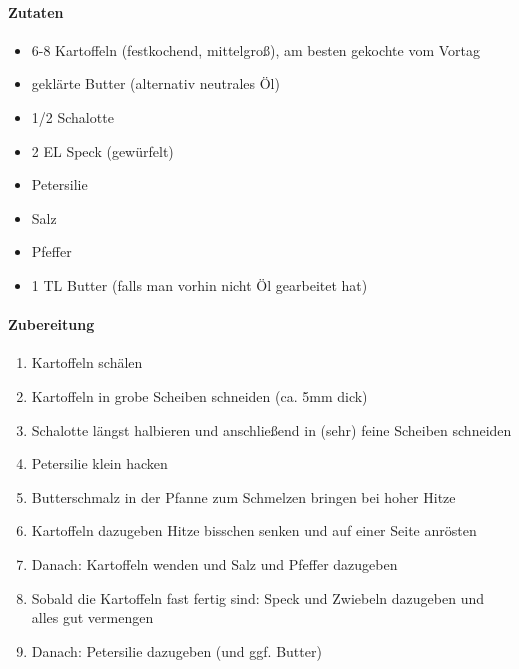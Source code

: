 \newpage
{}
\paragraph{Zutaten}
\begin{itemize}[noitemsep]
	\item 6-8 Kartoffeln (festkochend, mittelgroß), am besten gekochte vom Vortag
	\item geklärte Butter (alternativ neutrales Öl)
	\item 1/2 Schalotte
	\item 2 EL Speck (gewürfelt)
	\item Petersilie 
	\item Salz
	\item Pfeffer
	\item 1 TL Butter (falls man vorhin nicht Öl gearbeitet hat)
\end{itemize}
\paragraph{Zubereitung}
\begin{enumerate}[noitemsep]
	\item Kartoffeln schälen
	\item Kartoffeln in grobe Scheiben schneiden (ca. 5mm dick)
	\item Schalotte längst halbieren und anschließend in (sehr) feine Scheiben schneiden 
	\item Petersilie klein hacken 
	\item Butterschmalz in der Pfanne zum Schmelzen bringen bei hoher Hitze
	\item Kartoffeln dazugeben Hitze bisschen senken und auf einer Seite anrösten 
	\item Danach: Kartoffeln wenden und Salz und Pfeffer dazugeben	
	\item Sobald die Kartoffeln fast fertig sind: Speck und Zwiebeln dazugeben und alles gut vermengen
	\item Danach: Petersilie dazugeben (und ggf. Butter)
\end{enumerate}
